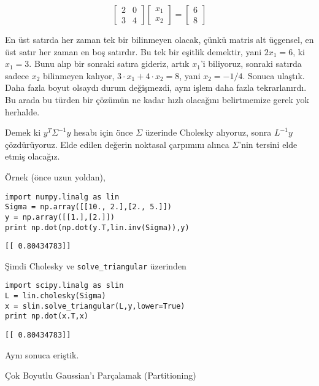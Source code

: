 \documentclass[12pt,fleqn]{article}\usepackage{../../common}
\begin{document}
$$ 
\left[\begin{array}{cc}
2 & 0 \\
3 & 4
\end{array}\right]
\left[\begin{array}{c}
x_1\\
x_2
\end{array}\right]
= 
\left[\begin{array}{c}
6\\
8
\end{array}\right]
 $$

En üst satırda her zaman tek bir bilinmeyen olacak, çünkü matris alt üçgensel,
en üst satır her zaman en boş satırdır. Bu tek bir eşitlik
demektir, yani $2x_1 = 6$, ki $x_1 = 3$. Bunu alıp bir sonraki satıra gideriz,
artık $x_1$'i biliyoruz, sonraki satırda sadece $x_2$ bilinmeyen
kalıyor, $3\cdot x_1 + 4 \cdot x_2 = 8$, yani $x_2 = -1/4$. Sonuca
ulaştık. Daha fazla boyut olsaydı durum değişmezdi, aynı işlem daha fazla
tekrarlanırdı. Bu arada bu türden bir çözümün ne kadar hızlı olacağını
belirtmemize gerek yok herhalde.

Demek ki $y^T\Sigma^{-1}y$ hesabı için önce $\Sigma$ üzerinde Cholesky
alıyoruz, sonra $L^{-1}y$ çözdürüyoruz. Elde edilen değerin noktasal
çarpımını alınca $\Sigma$'nin tersini elde etmiş olacağız. 

Örnek (önce uzun yoldan),

\begin{verbatim}
import numpy.linalg as lin
Sigma = np.array([[10., 2.],[2., 5.]])
y = np.array([[1.],[2.]])
print np.dot(np.dot(y.T,lin.inv(Sigma)),y)
\end{verbatim}

\begin{verbatim}
[[ 0.80434783]]
\end{verbatim}

Şimdi Cholesky ve \verb!solve_triangular! üzerinden

\begin{verbatim}
import scipy.linalg as slin
L = lin.cholesky(Sigma)
x = slin.solve_triangular(L,y,lower=True)
print np.dot(x.T,x)
\end{verbatim}

\begin{verbatim}
[[ 0.80434783]]
\end{verbatim}

Aynı sonuca eriştik.



Çok Boyutlu Gaussian'ı Parçalamak (Partitioning)
\end{document}

